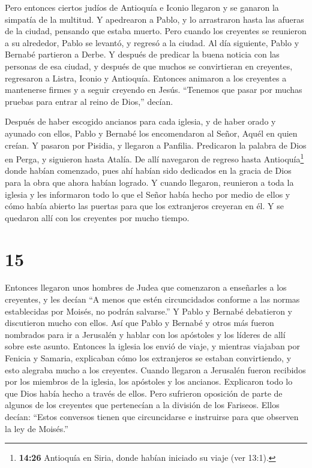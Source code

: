  Pero entonces ciertos judíos de Antioquía e Iconio
llegaron y se ganaron la simpatía de la multitud. Y apedrearon a Pablo,
y lo arrastraron hasta las afueras de la ciudad, pensando que estaba
muerto.  Pero cuando los creyentes se reunieron a su
alrededor, Pablo se levantó, y regresó a la ciudad. Al día siguiente,
Pablo y Bernabé partieron a Derbe.  Y después de predicar
la buena noticia con las personas de esa ciudad, y después de que muchos
se convirtieran en creyentes, regresaron a Listra, Iconio y Antioquía.
 Entonces animaron a los creyentes a mantenerse firmes y a
seguir creyendo en Jesús. ``Tenemos que pasar por muchas pruebas para
entrar al reino de Dios,'' decían.

 Después de haber escogido ancianos para cada iglesia, y de
haber orado y ayunado con ellos, Pablo y Bernabé los encomendaron al
Señor, Aquél en quien creían.  Y pasaron por Pisidia, y
llegaron a Panfilia.  Predicaron la palabra de Dios en
Perga, y siguieron hasta Atalía.  De allí navegaron de
regreso hasta Antioquía\footnote{\textbf{14:26} Antioquía en Siria,
  donde habían iniciado su viaje (ver 13:1).} donde habían comenzado,
pues ahí habían sido dedicados en la gracia de Dios para la obra que
ahora habían logrado.  Y cuando llegaron, reunieron a toda
la iglesia y les informaron todo lo que el Señor había hecho por medio
de ellos y cómo había abierto las puertas para que los extranjeros
creyeran en él.  Y se quedaron allí con los creyentes por
mucho tiempo.

\hypertarget{section-14}{%
\section{15}\label{section-14}}

 Entonces llegaron unos hombres de Judea que comenzaron a
enseñarles a los creyentes, y les decían ``A menos que estén
circuncidados conforme a las normas establecidas por Moisés, no podrán
salvarse.''  Y Pablo y Bernabé debatieron y discutieron
mucho con ellos. Así que Pablo y Bernabé y otros más fueron nombrados
para ir a Jerusalén y hablar con los apóstoles y los líderes de allí
sobre este asunto.  Entonces la iglesia los envió de viaje,
y mientras viajaban por Fenicia y Samaria, explicaban cómo los
extranjeros se estaban convirtiendo, y esto alegraba mucho a los
creyentes.  Cuando llegaron a Jerusalén fueron recibidos por
los miembros de la iglesia, los apóstoles y los ancianos. Explicaron
todo lo que Dios había hecho a través de ellos.  Pero
sufrieron oposición de parte de algunos de los creyentes que pertenecían
a la división de los Fariseos. Ellos decían: ``Estos conversos tienen
que circuncidarse e instruirse para que observen la ley de Moisés.''

